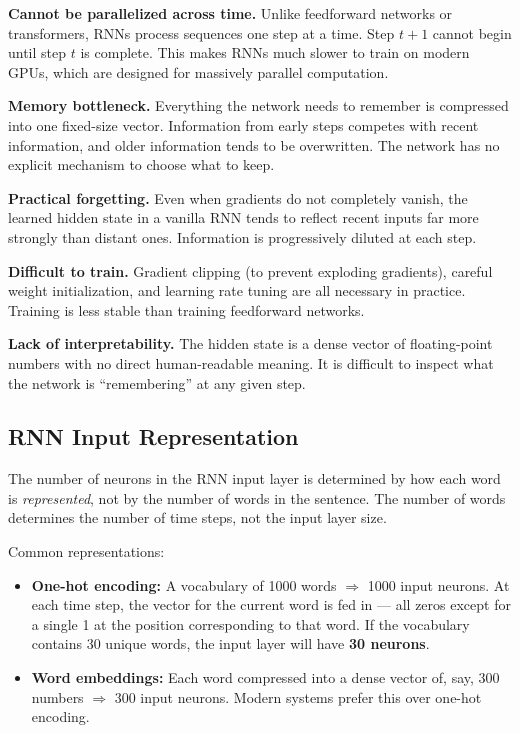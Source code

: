 \textbf{Cannot be parallelized across time.}
Unlike feedforward networks or transformers, RNNs process sequences one step at a time.
Step $t{+}1$ cannot begin until step $t$ is complete. This makes RNNs much slower to
train on modern GPUs, which are designed for massively parallel computation.

\textbf{Memory bottleneck.}
Everything the network needs to remember is compressed into one fixed-size vector.
Information from early steps competes with recent information, and older information
tends to be overwritten. The network has no explicit mechanism to choose what to keep.

\textbf{Practical forgetting.}
Even when gradients do not completely vanish, the learned hidden state in a vanilla RNN
tends to reflect recent inputs far more strongly than distant ones. Information is
progressively diluted at each step.

\textbf{Difficult to train.}
Gradient clipping (to prevent exploding gradients), careful weight initialization,
and learning rate tuning are all necessary in practice. Training is less stable than
training feedforward networks.

\textbf{Lack of interpretability.}
The hidden state is a dense vector of floating-point numbers with no direct
human-readable meaning. It is difficult to inspect what the network is ``remembering''
at any given step.

\subsection{RNN Input Representation}

The number of neurons in the RNN input layer is determined by how each word is
\textit{represented}, not by the number of words in the sentence. The number of words
determines the number of time steps, not the input layer size.

Common representations:
\begin{itemize}
    \item \textbf{One-hot encoding:} A vocabulary of 1000 words $\Rightarrow$ 1000 input
          neurons. At each time step, the vector for the current word is fed in --- all
          zeros except for a single 1 at the position corresponding to that word. If the
          vocabulary contains 30 unique words, the input layer will have \textbf{30
          neurons}.
    \item \textbf{Word embeddings:} Each word compressed into a dense vector of, say,
          300 numbers $\Rightarrow$ 300 input neurons. Modern systems prefer this over
          one-hot encoding.
\end{itemize}

